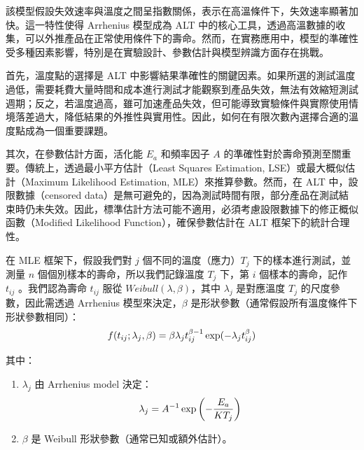 \hspace*{8mm} 該模型假設失效速率與溫度之間呈指數關係，表示在高溫條件下，失效速率顯著加快。這一特性使得 Arrhenius 模型成為 ALT 中的核心工具，透過高溫數據的收集，可以外推產品在正常使用條件下的壽命。然而，在實務應用中，模型的準確性受多種因素影響，特別是在實驗設計、參數估計與模型辨識方面存在挑戰。

\hspace*{8mm} 首先，溫度點的選擇是 ALT 中影響結果準確性的關鍵因素。如果所選的測試溫度過低，需要耗費大量時間和成本進行測試才能觀察到產品失效，無法有效縮短測試週期；反之，若溫度過高，雖可加速產品失效，但可能導致實驗條件與實際使用情境落差過大，降低結果的外推性與實用性。因此，如何在有限次數內選擇合適的溫度點成為一個重要課題。

\hspace*{8mm} 其次，在參數估計方面，活化能 $E_a$ 和頻率因子 $A$ 的準確性對於壽命預測至關重要。傳統上，透過最小平方估計（Least Squares Estimation, LSE）或最大概似估計（Maximum Likelihood Estimation, MLE）來推算參數。然而，在 ALT 中，設限數據（censored data）是無可避免的，因為測試時間有限，部分產品在測試結束時仍未失效。因此，標準估計方法可能不適用，必須考慮設限數據下的修正概似函數（Modified Likelihood Function），確保參數估計在 ALT 框架下的統計合理性。

\hspace*{8mm} 在 MLE 框架下，假設我們對 $j$ 個不同的溫度（應力）$T_j$ 下的樣本進行測試，並測量 $n$ 個個別樣本的壽命，所以我們記錄溫度 $T_j$ 下，第 $i$ 個樣本的壽命，記作 $t_{ij}$ 。我們認為壽命 $t_{ij}$ 服從 $Weibull(\lambda,\beta)$，其中 $\lambda_j$ 是對應溫度 $T_j$ 的尺度參數，因此需透過 Arrhenius 模型來決定，$\beta$ 是形狀參數（通常假設所有溫度條件下形狀參數相同）：
\begin{equation} \notag
f(t_{ij}; \lambda_j, \beta) = \beta \lambda_j t_{ij}^{\beta - 1} \exp(-\lambda_j t_{ij}^\beta)
\end{equation}

其中：
\begin{enumerate}
\item $\lambda_j$ 由 Arrhenius model 決定：
\begin{equation} \notag
\lambda_j = A^{-1} \exp\left(-\frac{E_a}{K T_j}\right)
\end{equation}
\item $\beta$ 是 Weibull 形狀參數（通常已知或額外估計）。
\end{enumerate}

